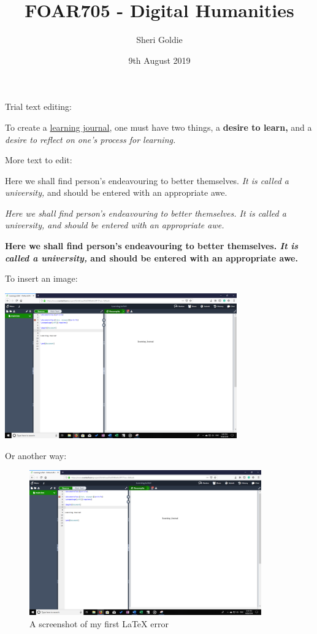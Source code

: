 \documentclass[14pt, a4paper]{article}
\title{FOAR705 - Digital Humanities}
\author{Sheri Goldie}
\date{9th August 2019}
\begin{document}
\maketitle
Trial text editing:

To create a \underline{learning journal}, one must have two things, a \textbf{desire to learn,} and a \textit{desire to reflect on one's process for learning.}

More text to edit:

Here we shall find person's endeavouring to better themselves. \emph{It is called a university,} and should be entered with an appropriate awe. 

\textit{Here we shall find person's endeavouring to better themselves. \emph{It is called a university,} and should be entered with an appropriate awe.}

\textbf{Here we shall find person's endeavouring to better themselves. \emph{It is called a university,} and should be entered with an appropriate awe.}

To insert an image:

\includegraphics[width=10cm]{20190809Screenshot1.png}

\pagebreak
Or another way:
\begin{figure}[h]
    \centering
    \includegraphics[width=10cm]{20190809Screenshot1.png}
    \caption{A screenshot of my first LaTeX error}
    \label{fig:screenshoterror}
\end{figure}
\end{document}
